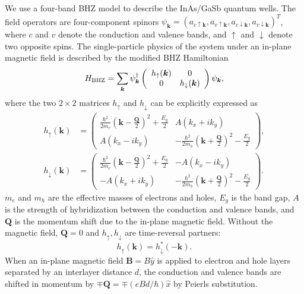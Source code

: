 \documentclass[reprint,aps,superscriptaddress]{revtex4-2}
\begin{document}
We use a four-band BHZ model \cite{bernevig2006quantum,liu2008quantum} to describe the InAs/GaSb quantum wells. 
The field operators are four-component spinors $\psi_{\bm k}=(a_{c\uparrow\bm k},a_{v\uparrow\bm k},a_{c\downarrow\bm k},a_{v\downarrow\bm k})^T$, where $c$ and $v$ denote the conduction and valence bands, and $\uparrow$ and $\downarrow$ denote two opposite spins.
The single-particle physics of the system under an in-plane magnetic field is described by the modified BHZ 
Hamiltonian \cite{Hu2016,hu2017topological}
\begin{equation} \label{eq:H_BHZ}
H_{\rm{BHZ}} = \sum_{\bm k} \psi_{\bm k}^{\dagger} \left(\begin{array}{cc}
h_{\uparrow}(\bm k) & 0 \\
0 & h_{\downarrow}(\bm k)
\end{array}\right) \psi_{\bm k},
\end{equation}
where the two $2\times 2$ matrices $h_{\uparrow}$ and $h_{\downarrow}$ can be explicitly expressed as
\begin{equation} \label{eq:h}
\begin{split}
h_{\uparrow}(\bm k) &= \left(\begin{array}{cc}
\frac{\hbar^2}{2m_e}(\bm k-\frac{\bm Q}{2})^2+\frac{E_g}{2} & A(k_x+ik_y) \\
A(k_x-ik_y) & -\frac{\hbar^2}{2m_h}(\bm k+\frac{\bm Q}{2})^2-\frac{E_g}{2}
\end{array}\right), \\
h_{\downarrow}(\bm k) &= \left(\begin{array}{cc}
\frac{\hbar^2}{2m_e}(\bm k-\frac{\bm Q}{2})^2+\frac{E_g}{2} & -A(k_x-ik_y) \\
-A(k_x+ik_y) & -\frac{\hbar^2}{2m_h}(\bm k+\frac{\bm Q}{2})^2-\frac{E_g}{2}
\end{array}\right).
\end{split}
\end{equation}
$m_e$ and $m_h$ are the effective masses of electrons and holes, $E_g$ is the band gap, $A$ is the strength of hybridization between the conduction and valence bands, and $\bm Q$ is the momentum shift due to the in-plane magnetic field. Without the magnetic field, $\bm Q=0$ and $h_{\uparrow},h_{\downarrow}$ are time-reversal partners:
\begin{equation}
h_{\uparrow}(\bm k) = h_{\downarrow}^*(-\bm k).
\end{equation}
When an in-plane magnetic field $\bm B=B\hat y$ is applied to electron and hole layers separated by an interlayer distance $d$, the conduction and valence bands are shifted in momentum by $\mp \bm Q=\mp (eBd/\hbar) \hat x$ by Peierls substitution. 
\end{document}
